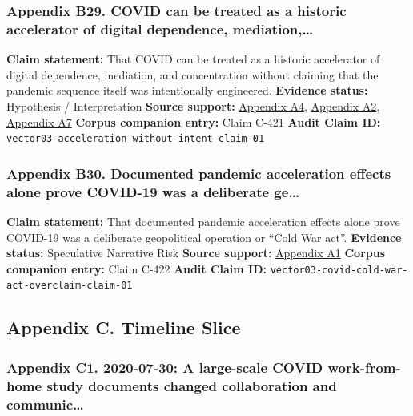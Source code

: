 \documentclass[
  american,
  11pt,
  letterpaper,
]{article}
\begin{document}
\subsubsection{Appendix B29. COVID can be treated as a historic
accelerator of digital dependence,
mediation,\ldots{}}\label{appendix-b29-covid-can-be-treated-as-a-historic-accelerator-of-digital-dependence-mediation}

\textbf{Claim statement:} That COVID can be treated as a historic
accelerator of digital dependence, mediation, and concentration without
claiming that the pandemic sequence itself was intentionally engineered.
\textbf{Evidence status:} Hypothesis / Interpretation \textbf{Source
support:}
\hyperref[appendix-a4-work-from-home-is-here-to-stay-call-for-flexibility-in-post-pandemic-work-policies]{Appendix
A4},
\hyperref[appendix-a2-big-tech-announces-striking-pandemic-gains-as-small-businesses-strain-to-find-their-footing]{Appendix
A2},
\hyperref[appendix-a7-what-social-media-told-about-us-in-the-time-of-covid-19-a-scoping-review]{Appendix
A7} \textbf{Corpus companion entry:} Claim C-421 \textbf{Audit Claim
ID:} \texttt{vector03-acceleration-without-intent-claim-01}

\subsubsection{Appendix B30. Documented pandemic acceleration effects
alone prove COVID-19 was a deliberate
ge\ldots{}}\label{appendix-b30-documented-pandemic-acceleration-effects-alone-prove-covid-19-was-a-deliberate-ge}

\textbf{Claim statement:} That documented pandemic acceleration effects
alone prove COVID-19 was a deliberate geopolitical operation or ``Cold
War act''. \textbf{Evidence status:} Speculative Narrative Risk
\textbf{Source support:}
\hyperref[appendix-a1-report-on-potential-links-between-the-wuhan-institute-of-virology-and-the-origins-of-covid-19]{Appendix
A1} \textbf{Corpus companion entry:} Claim C-422 \textbf{Audit Claim
ID:} \texttt{vector03-covid-cold-war-act-overclaim-claim-01}

\subsection{Appendix C. Timeline
Slice}\label{appendix-c.-timeline-slice}

\subsubsection{Appendix C1. 2020-07-30: A large-scale COVID
work-from-home study documents changed collaboration and
communic\ldots{}}\label{appendix-c1-2020-07-30-a-large-scale-covid-work-from-home-study-documents-changed-collaboration-and-communication-patterns}
\end{document}
